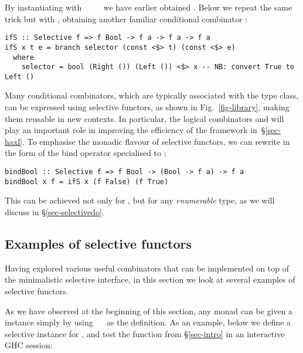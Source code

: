 {By instantiating  with ~\hs{=}~~\hs{=}~\hs{()} we have
earlier obtained . Below we repeat the same trick but with
, obtaining another familiar conditional combinator :

\vspace{1mm}
\begin{verbatim}
ifS :: Selective f => f Bool -> f a -> f a -> f a
ifS x t e = branch selector (const <$> t) (const <$> e)
  where
    selector = bool (Right ()) (Left ()) <$> x -- NB: convert True to Left ()
\end{verbatim}
\vspace{1mm}

\noindent
Many conditional combinators, which are typically associated with the 
type class, can be expressed using selective functors, as shown in
Fig.~\ref{fig-library}, making them reusable in new contexts. In particular, the
logical combinators \hs{<||>} and \hs{<&&>} will play an important role in
improving the efficiency of the \Haxl framework in~\S\ref{sec-haxl}. To
emphasise the monadic flavour of selective functors, we can rewrite  in
the form of the bind operator specialised to :

\vspace{1mm}
\begin{verbatim}
bindBool :: Selective f => f Bool -> (Bool -> f a) -> f a
bindBool x f = ifS x (f False) (f True)
\end{verbatim}
\vspace{1mm}

\noindent
This can be achieved not only for , but for any \emph{enumerable}
type, as we will discuss in \S\ref{sec-selectivedo}.

\subsection{Examples of selective functors}\label{sec-instances}

Having explored various useful combinators that can be implemented on top of the
minimalistic selective interface, in this section we look at several examples of
selective functors.

As we have observed at the beginning of this section, any monad can be given a
 instance simply by using ~\hs{=}~ as the
definition. As an example, below we define a selective instance for , and
test the function  from \S\ref{sec-intro} in an interactive GHC
session:

}
